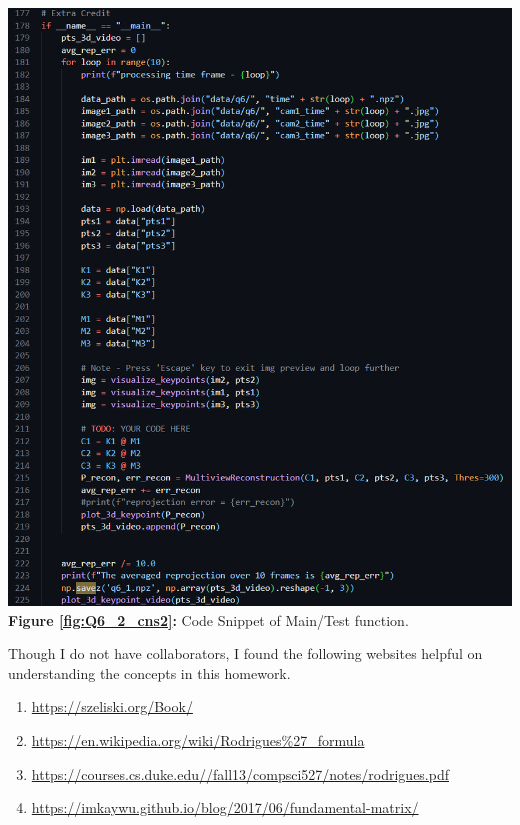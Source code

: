 \begin{your_solution}[title=Q6.2 continued,height=12.5cm,width=\linewidth]
\begin{minipage}[b]{0.5\textwidth}
	\includegraphics[width=\textwidth]{../Q6_2_cns2.png}
	\textbf{Figure \ref{fig:Q6_2_cns2}:} Code Snippet of Main/Test function.
	\label{fig:Q6_2_cns2}  
\end{minipage}	
\end{your_solution}

\begin{your_solution}[title=Collaboration,height=4.5cm,width=\linewidth]
Though I do not have collaborators, I found the following websites helpful on understanding the concepts in this homework.
\begin{enumerate}
	\item \url{https://szeliski.org/Book/}
	\item \url{https://en.wikipedia.org/wiki/Rodrigues%27_formula}
	\item \url{https://courses.cs.duke.edu//fall13/compsci527/notes/rodrigues.pdf}
	\item \url{https://imkaywu.github.io/blog/2017/06/fundamental-matrix/}		
\end{enumerate}
\end{your_solution}